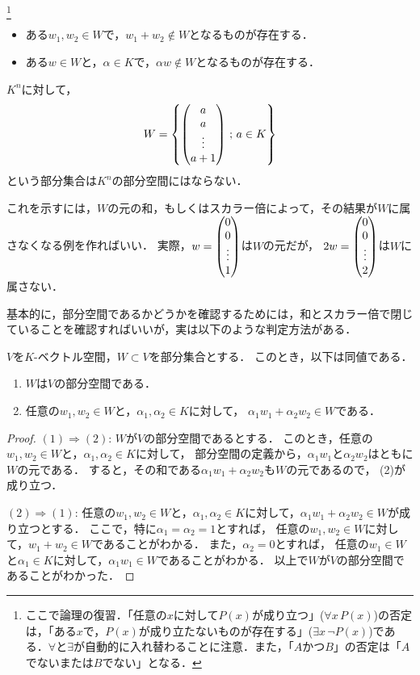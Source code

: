 \footnote{ここで論理の復習．「任意の$x$に対して$P(x)$が成り立つ」($\forall x\,P(x)$)の否定は，「ある$x$で，$P(x)$が成り立たないものが存在する」($\exists x\, \neg P(x)$)である．$\forall$と$\exists$が自動的に入れ替わることに注意．また，「$A$かつ$B$」の否定は「$A$でないまたは$B$でない」となる．}
\begin{itemize}
    \item ある$w_1,w_2 \in W$で，$w_1 + w_2 \not\in W$となるものが存在する．
    \item ある$w \in W$と，$\alpha \in K$で，$\alpha w \not\in W$となるものが存在する．
\end{itemize}
\begin{example}
    $K^n$に対して，
    \[
        W = \left\{ \begin{pmatrix} a \\ a \\ \vdots \\ a+1 \end{pmatrix} \,;\, a \in K\right\}
    \]
    という部分集合は$K^n$の部分空間にはならない．
    
    これを示すには，$W$の元の和，もしくはスカラー倍によって，その結果が$W$に属さなくなる例を作ればいい．
    実際，$w = \begin{pmatrix} 0 \\ 0 \\ \vdots \\ 1 \end{pmatrix}$は$W$の元だが，
    $2w = \begin{pmatrix} 0 \\ 0 \\ \vdots \\ 2 \end{pmatrix}$は$W$に属さない．
\end{example}
基本的に，部分空間であるかどうかを確認するためには，和とスカラー倍で閉じていることを確認すればいいが，実は以下のような判定方法がある．
\begin{prop}\label{prop:subspace_one_condition}
    $V$を$K$-ベクトル空間，$W \subset V$を部分集合とする．
    このとき，以下は同値である．
    \begin{enumerate}
        \item $W$は$V$の部分空間である．
        \item 任意の$w_1,w_2 \in W$と，$\alpha_1,\alpha_2 \in K$に対して，
        $\alpha_1 w_1 + \alpha_2 w_2 \in W$である．
    \end{enumerate}
\end{prop}
\begin{proof}
    $(1) \Rightarrow (2)$: $W$が$V$の部分空間であるとする．
    このとき，任意の$w_1,w_2 \in W$と，$\alpha_1,\alpha_2 \in K$に対して，
    部分空間の定義から，$\alpha_1 w_1$と$\alpha_2 w_2$はともに$W$の元である．
    すると，その和である$\alpha_1 w_1 + \alpha_2 w_2$も$W$の元であるので，
    (2)が成り立つ．
    
    \noindent
    $(2) \Rightarrow (1)$: 任意の$w_1,w_2 \in W$と，$\alpha_1,\alpha_2 \in K$に対して，$\alpha_1 w_1 + \alpha_2 w_2 \in W$が成り立つとする．
    ここで，特に$\alpha_1 = \alpha_2 = 1$とすれば，
    任意の$w_1,w_2 \in W$に対して，$w_1 + w_2 \in W$であることがわかる．
    また，$\alpha_2 = 0$とすれば，
    任意の$w_1 \in W$と$\alpha_1 \in K$に対して，$\alpha_1 w_1 \in W$であることがわかる．
    以上で$W$が$V$の部分空間であることがわかった．
\end{proof}
